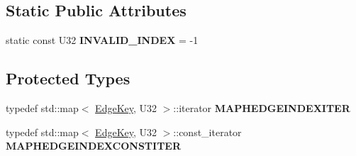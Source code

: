 \subsection*{Static Public Attributes}
\begin{DoxyCompactItemize}
\item 
\hypertarget{classps_1_1elastic_1_1VolMesh_a20f60f24dd56a38318528ddff20a91de}{}static const U32 {\bfseries I\+N\+V\+A\+L\+I\+D\+\_\+\+I\+N\+D\+E\+X} = -\/1\label{classps_1_1elastic_1_1VolMesh_a20f60f24dd56a38318528ddff20a91de}

\end{DoxyCompactItemize}
\subsection*{Protected Types}
\begin{DoxyCompactItemize}
\item 
\hypertarget{classps_1_1elastic_1_1VolMesh_aee7e3fe8936e4704c38aa7407bb0abf5}{}typedef std\+::map$<$ \hyperlink{classps_1_1elastic_1_1EdgeKey}{Edge\+Key}, U32 $>$\+::iterator {\bfseries M\+A\+P\+H\+E\+D\+G\+E\+I\+N\+D\+E\+X\+I\+T\+E\+R}\label{classps_1_1elastic_1_1VolMesh_aee7e3fe8936e4704c38aa7407bb0abf5}

\item 
\hypertarget{classps_1_1elastic_1_1VolMesh_ae1ecbb97b86bf07bd1a9cfe176b912d5}{}typedef std\+::map$<$ \hyperlink{classps_1_1elastic_1_1EdgeKey}{Edge\+Key}, U32 $>$\+::const\+\_\+iterator {\bfseries M\+A\+P\+H\+E\+D\+G\+E\+I\+N\+D\+E\+X\+C\+O\+N\+S\+T\+I\+T\+E\+R}\label{classps_1_1elastic_1_1VolMesh_ae1ecbb97b86bf07bd1a9cfe176b912d5}

\end{DoxyCompactItemize}
